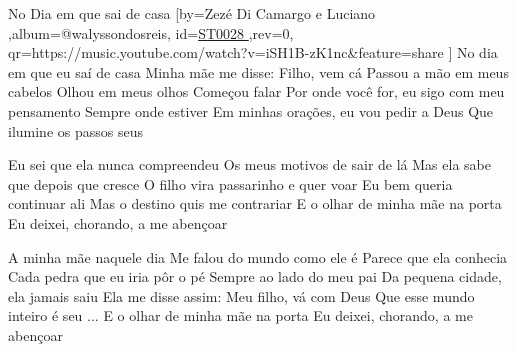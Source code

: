 \beginsong
{No Dia em que sai de casa %
}[by={Zezé Di Camargo e Luciano %
},album={@walyssondosreis},
id={\href{https://music.youtube.com/watch?v=iSH1B-zK1nc&feature=share %
}{ST0028 %
}},rev={0}, %
qr={https://music.youtube.com/watch?v=iSH1B-zK1nc&feature=share %
}]
\tom{}{}
\beginverse
No dia em que eu saí de casa
Minha mãe me disse: Filho, vem cá
Passou a mão em meus cabelos
Olhou em meus olhos
Começou falar
Por onde você for, eu sigo com meu pensamento
Sempre onde estiver
Em minhas orações, eu vou pedir a Deus
Que ilumine os passos seus
\endverse

\beginchorus
Eu sei que ela nunca compreendeu
Os meus motivos de sair de lá
Mas ela sabe que depois que cresce
O filho vira passarinho e quer voar
Eu bem queria continuar ali
Mas o destino quis me contrariar
E o olhar de minha mãe na porta
Eu deixei, chorando, a me abençoar
\endchorus

\beginverse
A minha mãe naquele dia
Me falou do mundo como ele é
Parece que ela conhecia
Cada pedra que eu iria pôr o pé
Sempre ao lado do meu pai
Da pequena cidade, ela jamais saiu
Ela me disse assim: Meu filho, vá com Deus
Que esse mundo inteiro é seu
\endverse
\beginverse
... E o olhar de minha mãe na porta
Eu deixei, chorando, a me abençoar
\endverse

